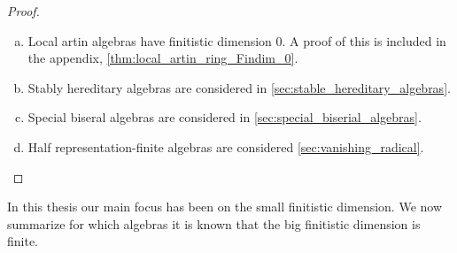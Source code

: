 \begin{theorem}
\begin{proof}
\begin{enumerate}[a)]
			\item Local artin algebras have finitistic dimension 0. A proof of this is included in the appendix, \cref{thm:local_artin_ring_Findim_0}.
			\item Stably hereditary algebras are considered in \cref{sec:stable_hereditary_algebras}.
			\item Special biseral algebras are considered in \cref{sec:special_biserial_algebras}.
			\item Half representation-finite algebras are considered \cref{sec:vanishing_radical}.
		\end{enumerate}
	\end{proof}
\end{theorem}

In this thesis our main focus has been on the small finitistic dimension. We now summarize for which algebras it is known that the big finitistic dimension is finite.

